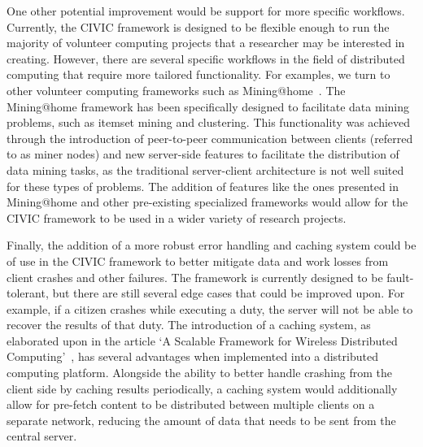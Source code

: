 \documentclass[11pt]{article}
\begin{document}
One other potential improvement would be support for more specific workflows. Currently, the CIVIC framework is designed to be flexible enough to run the majority of volunteer computing projects that a researcher may be interested in creating. However, there are several specific workflows in the field of distributed computing that require more tailored functionality. For examples, we turn to other volunteer computing frameworks such as Mining@home~\cite{Lucchese2010}. The Mining@home framework has been specifically designed to facilitate data mining problems, such as itemset mining and clustering. This functionality was achieved through the introduction of peer-to-peer communication between clients (referred to as miner nodes) and new server-side features to facilitate the distribution of data mining tasks, as the traditional server-client architecture is not well suited for these types of problems. The addition of features like the ones presented in Mining@home and other pre-existing specialized frameworks would allow for the CIVIC framework to be used in a wider variety of research projects.

Finally, the addition of a more robust error handling and caching system could be of use in the CIVIC framework to better mitigate data and work losses from client crashes and other failures. The framework is currently designed to be fault-tolerant, but there are still several edge cases that could be improved upon. For example, if a citizen crashes while executing a duty, the server will not be able to recover the results of that duty. The introduction of a caching system, as elaborated upon in the article `A Scalable Framework for Wireless Distributed Computing'~\cite{Li2017}, has several advantages when implemented into a distributed computing platform. Alongside the ability to better handle crashing from the client side by caching results periodically, a caching system would additionally allow for pre-fetch content to be distributed between multiple clients on a separate network, reducing the amount of data that needs to be sent from the central server.


\newpage
\thispagestyle{empty}

 
\end{document}
